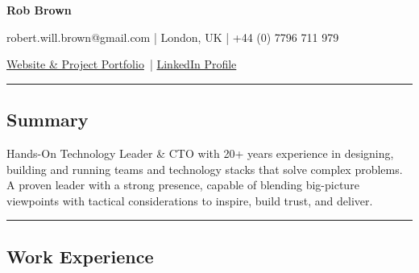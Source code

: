 \documentclass[10pt,a4paper]{article}
\begin{document}
\begin{center}
  {\LARGE \textbf{Rob Brown}}

  robert.will.brown@gmail.com |
  London, UK |
  +44 (0) 7796 711 979

  \href{https://robert-will-brown.github.io}{Website \& Project Portfolio}\ |
  \href{https://www.linkedin.com/in/robert-w-brown/}{LinkedIn Profile}
\end{center}

\hrule
\vspace{-0.4em}
\subsection*{Summary}

\begin{itemize*}
\item[] Hands-On Technology Leader \& CTO with 20+ years experience in designing, building and running teams and technology stacks that solve complex problems.  A proven leader with a strong presence, capable of blending big-picture viewpoints with tactical considerations to inspire, build trust, and deliver.
\end{itemize*}


\hrule
\vspace{-0.4em}
\subsection*{Work Experience}
\end{document}

